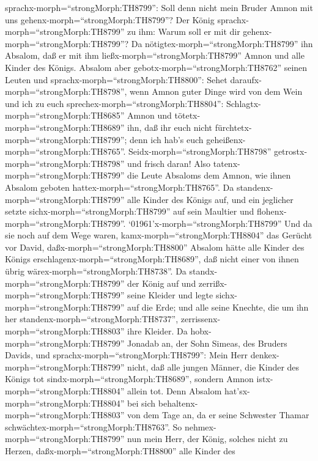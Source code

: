 sprachx-morph=``strongMorph:TH8799'': Soll denn nicht mein Bruder Amnon
mit uns gehenx-morph=``strongMorph:TH8799''? Der König
sprachx-morph=``strongMorph:TH8799'' zu ihm: Warum soll er mit dir
gehenx-morph=``strongMorph:TH8799''?  Da
nötigtex-morph=``strongMorph:TH8799'' ihn Absalom, daß er mit ihm
ließx-morph=``strongMorph:TH8799'' Amnon und alle Kinder des Königs.
 Absalom aber gebotx-morph=``strongMorph:TH8762'' seinen
Leuten und sprachx-morph=``strongMorph:TH8800'': Sehet
daraufx-morph=``strongMorph:TH8798'', wenn Amnon guter Dinge wird von
dem Wein und ich zu euch sprechex-morph=``strongMorph:TH8804'':
Schlagtx-morph=``strongMorph:TH8685'' Amnon und
tötetx-morph=``strongMorph:TH8689'' ihn, daß ihr euch nicht
fürchtetx-morph=``strongMorph:TH8799''; denn ich hab's euch
geheißenx-morph=``strongMorph:TH8765''.
Seidx-morph=``strongMorph:TH8798'' getrostx-morph=``strongMorph:TH8798''
und frisch daran!  Also tatenx-morph=``strongMorph:TH8799''
die Leute Absaloms dem Amnon, wie ihnen Absalom geboten
hattex-morph=``strongMorph:TH8765''. Da
standenx-morph=``strongMorph:TH8799'' alle Kinder des Königs auf, und
ein jeglicher setzte sichx-morph=``strongMorph:TH8799'' auf sein
Maultier und flohenx-morph=``strongMorph:TH8799''. 
`01961'\textbar x-morph=``strongMorph:TH8799'' Und da sie noch auf dem
Wege waren, kamx-morph=``strongMorph:TH8804'' das Gerücht vor David,
daßx-morph=``strongMorph:TH8800'' Absalom hätte alle Kinder des Königs
erschlagenx-morph=``strongMorph:TH8689'', daß nicht einer von ihnen
übrig wärex-morph=``strongMorph:TH8738''.  Da
standx-morph=``strongMorph:TH8799'' der König auf und
zerrißx-morph=``strongMorph:TH8799'' seine Kleider und legte
sichx-morph=``strongMorph:TH8799'' auf die Erde; und alle seine Knechte,
die um ihn her standenx-morph=``strongMorph:TH8737'',
zerrissenx-morph=``strongMorph:TH8803'' ihre Kleider.  Da
hobx-morph=``strongMorph:TH8799'' Jonadab an, der Sohn Simeas, des
Bruders Davids, und sprachx-morph=``strongMorph:TH8799'': Mein Herr
denkex-morph=``strongMorph:TH8799'' nicht, daß alle jungen Männer, die
Kinder des Königs tot sindx-morph=``strongMorph:TH8689'', sondern Amnon
istx-morph=``strongMorph:TH8804'' allein tot. Denn Absalom
hat'sx-morph=``strongMorph:TH8804'' bei sich
behaltenx-morph=``strongMorph:TH8803'' von dem Tage an, da er seine
Schwester Thamar schwächtex-morph=``strongMorph:TH8763''. 
So nehmex-morph=``strongMorph:TH8799'' nun mein Herr, der König, solches
nicht zu Herzen, daßx-morph=``strongMorph:TH8800'' alle Kinder des
